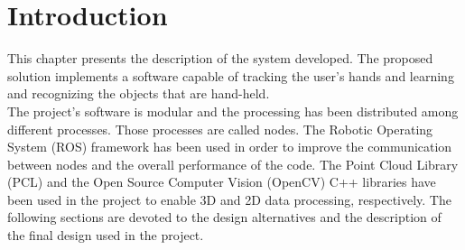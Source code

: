 \section{Introduction}

This chapter presents the description of the system developed.
The proposed solution implements a software capable of tracking the user's hands and learning and recognizing the objects that are hand-held. 
\\



The project's software is modular and the processing has been distributed among different processes.
Those processes are called nodes.  
The Robotic Operating System (ROS) framework has been used in order to improve the communication between nodes and the overall performance of the code. The Point Cloud Library (PCL) and 
the Open Source Computer Vision (OpenCV) C++ libraries have been used in the project to enable 3D and 2D data processing, respectively. 
The following sections are devoted to the design alternatives and the description of the final design used in the project. 